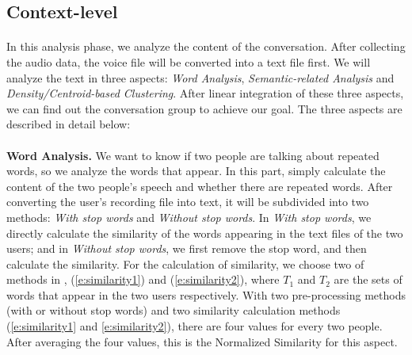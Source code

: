 \documentclass[a4paper,12pt]{report}
\begin{document}
\subsection{Context-level}
\paragraph{}
In this analysis phase, we analyze the content of the conversation. After collecting the audio data, the voice file will be converted into a text file first. We will analyze the text in three aspects: \emph{Word Analysis}, \emph{Semantic-related Analysis} and \emph{Density/Centroid-based Clustering}. After linear integration of these three aspects, we can find out the conversation group to achieve our goal. The three aspects are described in detail below:
\paragraph{}
\textbf{Word Analysis.} We want to know if two people are talking about repeated words, so we analyze the words that appear. In this part, simply calculate the content of the two people's speech and whether there are repeated words. After converting the user's recording file into text, it will be subdivided into two methods: \emph{With stop words} and \emph{Without stop words}. In \emph{With stop words}, we directly calculate the similarity of the words appearing in the text files of the two users; and in \emph{Without stop words}, we first remove the stop word, and then calculate the similarity. For the calculation of similarity, we choose two of methods in \cite{9198782}, (\ref{e:similarity1}) and (\ref{e:similarity2}), where $T_1$ and $T_2$ are the sets of words that appear in the two users respectively. With two pre-processing methods (with or without stop words) and two similarity calculation methods (\ref{e:similarity1} and \ref{e:similarity2}), there are four values for every two people. After averaging the four values, this is the Normalized Similarity for this aspect.
\\

\end{document}
